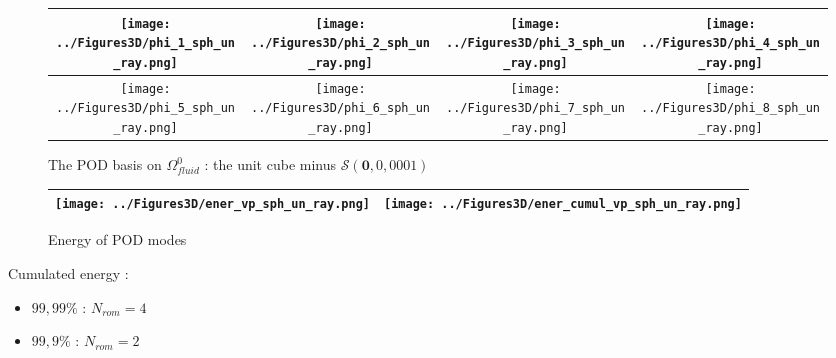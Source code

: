 

\begin{figure}[H]%
%
\begin{center}
\begin{tabular}{|c|c|c|c|}
\hline
\texttt{[image: ../Figures3D/phi\_1\_sph\_un\_ray.png]}%
&%
\texttt{[image: ../Figures3D/phi\_2\_sph\_un\_ray.png]}%
&%
\texttt{[image: ../Figures3D/phi\_3\_sph\_un\_ray.png]}%
&%
\texttt{[image: ../Figures3D/phi\_4\_sph\_un\_ray.png]}%
\\
\hline
\texttt{[image: ../Figures3D/phi\_5\_sph\_un\_ray.png]}%
&%
\texttt{[image: ../Figures3D/phi\_6\_sph\_un\_ray.png]}%
&%
\texttt{[image: ../Figures3D/phi\_7\_sph\_un\_ray.png]}%
&%
\texttt{[image: ../Figures3D/phi\_8\_sph\_un\_ray.png]}%
\\
\hline
\end{tabular}
\end{center}
%
\caption{The POD basis on $\Omega_{fluid}^0$ : the unit cube minus $\mathcal{S}(\mathbf{0},0,0001)$}
\end{figure}

\begin{figure}[H]
\begin{center}
\begin{tabular}{|c|c|}
\hline
\texttt{[image: ../Figures3D/ener\_vp\_sph\_un\_ray.png]}
&%
\texttt{[image: ../Figures3D/ener\_cumul\_vp\_sph\_un\_ray.png]}
\\ \hline
\end{tabular}
\end{center}
\caption{Energy of POD modes}
\end{figure}

\begin{multicols}{2}
Cumulated energy :

\columnbreak
\begin{itemize}
\item $99,99\%$ : $N_{rom}=4$
\item $99,9\%$ : $N_{rom}=2$
\end{itemize}
%
\end{multicols}

